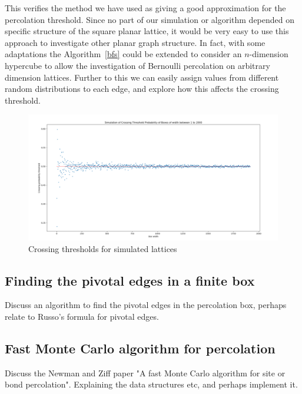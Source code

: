 \documentclass[a4paper,11pt]{article}
\theoremstyle{definition}
\begin{document}
This verifies the method we have used as giving a good approximation for the percolation threshold. Since no part of our simulation or algorithm depended on specific structure of the square planar lattice, it would be very easy to use this approach to investigate other planar graph structure. In fact, with some adaptations the Algorithm~\ref*{bfs} could be extended to consider an $n$-dimension hypercube to allow the investigation of Bernoulli percolation on arbitrary dimension lattices. Further to this we can easily assign values from different random distributions to each edge, and explore how this affects the crossing threshold.



\begin{landscape}
\begin{figure}
	\centering
	\includegraphics[scale=0.472]{CrossingSimulationPlot3.png}
	\caption{Crossing thresholds for simulated lattices}
	\label{fig:thresholdplot2}
\end{figure}
\end{landscape}
\subsection{Finding the pivotal edges in a finite box}
Discuss an algorithm to find the pivotal edges in the percolation box, perhaps relate to Russo's formula for pivotal edges.
\subsection{Fast Monte Carlo algorithm for percolation}
Discuss the Newman and Ziff paper "A fast Monte Carlo algorithm for site or bond percolation". Explaining the data structures etc, and perhaps implement it.
\end{document}
